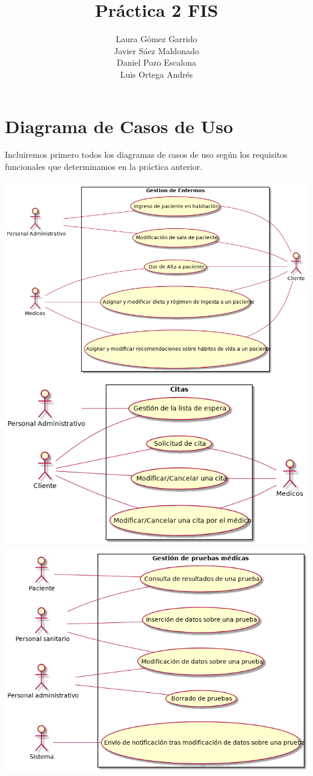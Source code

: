 \documentclass[10pt,a4paper,spanish]{report}
\title{\textbf{Práctica 2 FIS}}
\author{Laura Gómez Garrido\\
		Javier Sáez Maldonado\\
		Daniel Pozo Escalona\\
		Luis Ortega Andrés}
\begin{document}
\maketitle

\section*{Diagrama de Casos de Uso}

Incluiremos primero todos los diagramas de casos de uso según los requisitos funcionales que determinamos en la práctica anterior.

\begin{center}
	\includegraphics[scale=0.4]{GestionDeEnfermos}\\
	\includegraphics[scale=0.5]{GestionDeCitas}\\
	\includegraphics[scale=0.4]{gestion-de-pruebas-medicas}\\

\end{center}
\end{document}
